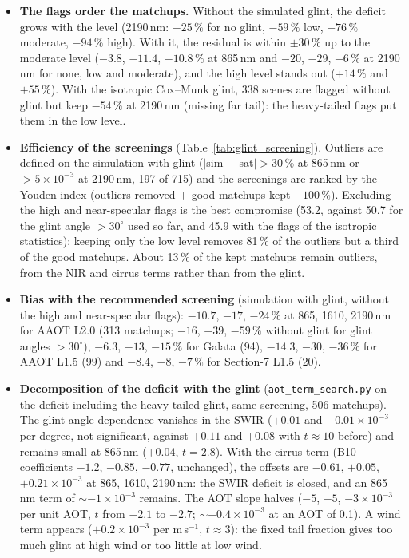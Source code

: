 \documentclass[11pt,a4paper]{article}
\newcommand{\code}[1]{\texttt{#1}}
\begin{document}
\begin{itemize}
\item \textbf{The flags order the matchups.} Without the simulated glint, the deficit grows with the level (2190\,nm:
  $-25\,\%$ for no glint, $-59\,\%$ low, $-76\,\%$ moderate, $-94\,\%$ high). With it, the residual is within
  $\pm30\,\%$ up to the moderate level ($-3.8$, $-11.4$, $-10.8\,\%$ at 865\,nm and $-20$, $-29$, $-6\,\%$ at
  2190\,nm for none, low and moderate), and the high level stands out ($+14\,\%$ and $+55\,\%$). With the isotropic
  Cox--Munk glint, 338 scenes are flagged without glint but keep $-54\,\%$ at 2190\,nm (missing far tail): the
  heavy-tailed flags put them in the low level.
\item \textbf{Efficiency of the screenings} (Table~\ref{tab:glint_screening}). Outliers are defined on the
  simulation with glint ($|$sim $-$ sat$| > 30\,\%$ at 865\,nm or $>5\times10^{-3}$ at 2190\,nm, 197 of 715) and the
  screenings are ranked by the Youden index (outliers removed $+$ good matchups kept $-100\,\%$). Excluding the high
  and near-specular flags is the best compromise (53.2, against 50.7 for the glint angle $>30^\circ$ used so far,
  and 45.9 with the flags of the isotropic statistics); keeping only the low level removes 81\,\% of the outliers
  but a third of the good matchups. About 13\,\% of the kept matchups remain outliers, from the NIR and cirrus
  terms rather than from the glint.
\item \textbf{Bias with the recommended screening} (simulation with glint, without the high and near-specular
  flags): $-10.7$, $-17$, $-24\,\%$ at 865, 1610, 2190\,nm for AAOT L2.0 (313 matchups; $-16$, $-39$, $-59\,\%$
  without glint for glint angles $>30^\circ$), $-6.3$, $-13$, $-15\,\%$ for Galata (94), $-14.3$, $-30$, $-36\,\%$
  for AAOT L1.5 (99) and $-8.4$, $-8$, $-7\,\%$ for Section-7 L1.5 (20).
\item \textbf{Decomposition of the deficit with the glint} (\code{aot\_term\_search.py} on the deficit including
  the heavy-tailed glint, same screening, 506 matchups). The glint-angle dependence vanishes in the SWIR ($+0.01$ and
  $-0.01\times10^{-3}$ per degree, not significant, against $+0.11$ and $+0.08$ with $t\approx10$ before) and
  remains small at 865\,nm ($+0.04$, $t=2.8$). With the cirrus term (B10 coefficients $-1.2$, $-0.85$, $-0.77$,
  unchanged), the offsets are $-0.61$, $+0.05$, $+0.21\times10^{-3}$ at 865, 1610, 2190\,nm: the SWIR deficit is
  closed, and an 865\,nm term of $\sim-1\times10^{-3}$ remains. The AOT slope halves ($-5$, $-5$, $-3\times10^{-3}$ per
  unit AOT, $t$ from $-2.1$ to $-2.7$; $\sim-0.4\times10^{-3}$ at an AOT of 0.1). A wind term appears ($+0.2\times10^{-3}$
  per m\,s$^{-1}$, $t\approx3$): the fixed tail fraction gives too much glint at high wind or too little at low wind.
\end{itemize}
\end{document}
